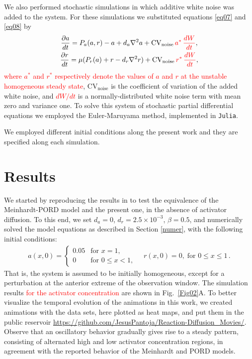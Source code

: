 \documentclass[%
 preprint,
 aip, 
 amsmath,amssymb,
]{revtex4-2}
\begin{document}
We also performed stochastic simulations in which additive white noise was added to the system. For these simulations we substituted equations \eqref{eq07} and
	\eqref{eq08} by
	\begin{subequations}\label{eq1112}
		\begin{gather}
		\frac{\partial a}{dt} = P_a(a, r) - a + d_a \nabla^2 a + \text{CV}_{\text{noise}} \, \textcolor{red}{a^* \,\frac{dW}{dt}}, \label{eq11} \\
		\frac{\partial r}{dt}= \mu (P_r(a) + r - d_r \nabla^2 r) + \text{CV}_{\text{noise}} \, \textcolor{red}{r^* \,\frac{dW}{dt}}, \label{eq12}
		\end{gather}
	\end{subequations}
\textcolor{red}{where $a^*$ and $r^*$ respectively denote the  values of  $a$ and $r$ at the unstable homogeneous steady state}, $\text{CV}_{\text{noise}}$ is the coefficient of variation of the added white noise, and \textcolor{red}{$dW/dt$} is a normally-distributed white noise term with mean zero and variance one. To solve this system of stochastic partial differential equations we employed the Euler-Maruyama method, implemented in \texttt{Julia}.
	
We employed different initial conditions along the present work and they are specified along each simulation.

\section{Results}
\label{res}
	
We started by reproducing the results in \cite{Cotterell2015} to test the equivalence of the Meinhardt-PORD model and the present one, in the absence of activator diffusion. To this end, we set $d_a=0$, $d_r = 2.5\times10^{-3}$, $\beta = 0.5$, and numerically solved the model equations as described in Section \ref{numer}, with the following initial conditions:
	\begin{gather}
	a(x, 0) = \left\{\begin{array}{cl}
	0.05 & \text{for } x = 1, \\
	0 & \text{for } 0 \leq x < 1,
	\end{array} \right. 
	\quad
	r(x, 0) = 0, \; \text{for } 0 \leq x \leq 1\,.
	\end{gather}
That is, the system is assumed to be initially homogeneous, except for a perturbation at the anterior extreme of the observation window. The simulation results \textcolor{red}{for the activator concentration} are shown in Fig.~\ref{Fig02}A. To better visualize the temporal evolution of the animations in this work, we created animations with the data sets, here plotted as heat maps, and put them in the public reservoir \url{https://github.com/JesusPantoja/Reaction-Diffusion_Movies/}. Observe that an oscillatory behavior gradually gives rise to a steady pattern, consisting of alternated high and low activator concentration regions, in agreement with the reported behavior of the Meinhardt \cite{Meinhardt1982} and PORD \citep{Cotterell2015} models. 
	
\end{document}
